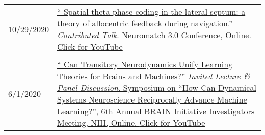 \documentclass[10pt]{article}
\newcommand{\itemtitle}[1]{{\color{hopkinsblue}\ul{#1}}}
\newcommand{\unpubtitle}[1]{{\color{hopkinsblue} #1}}
\begin{document}

\begin{longtable}{@{\hspace{0.2in}}l>{\raggedright\arraybackslash}p{}}
  10/29/2020 &
  \href{https://www.youtube.com/watch?v=WwYDMpD7j4Q}{``\unpubtitle{Spatial
      theta-phase coding in the lateral septum: a theory of allocentric feedback
    during navigation}.'' \emph{Contributed Talk}. Neuromatch 3.0 Conference,
  Online. \itemtitle{Click for YouTube}}\\
  \tabularnewline
  6/1/2020 \hspace{0.3in} &
  \href{https://youtu.be/2jy1ENYHRAw?t=902}{``\unpubtitle{Can Transitory
    Neurodynamics Unify Learning Theories for Brains and Machines?}''
    \emph{Invited Lecture \& Panel Discussion}. Symposium on ``How Can Dynamical
    Systems Neuroscience Reciprocally Advance Machine Learning?'', 6th Annual
    BRAIN Initiative Investigators Meeting, NIH, Online. \itemtitle{Click for
  YouTube}}\\

\end{longtable}
\end{document}
